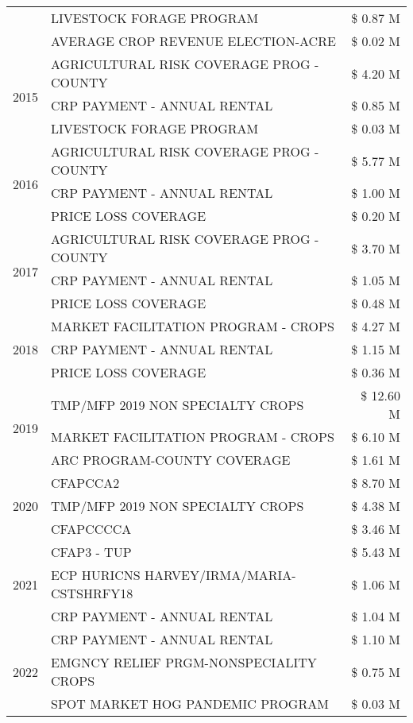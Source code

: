 \begin{tabular}{llr}
 & LIVESTOCK FORAGE PROGRAM & \$ 0.87 M \\
 & AVERAGE CROP REVENUE ELECTION-ACRE & \$ 0.02 M \\
\cline{1-3}
\multirow[t]{3}{*}{2015} & AGRICULTURAL RISK COVERAGE PROG - COUNTY & \$ 4.20 M \\
 & CRP PAYMENT - ANNUAL RENTAL & \$ 0.85 M \\
 & LIVESTOCK FORAGE PROGRAM & \$ 0.03 M \\
\cline{1-3}
\multirow[t]{3}{*}{2016} & AGRICULTURAL RISK COVERAGE PROG - COUNTY & \$ 5.77 M \\
 & CRP PAYMENT - ANNUAL RENTAL & \$ 1.00 M \\
 & PRICE LOSS COVERAGE & \$ 0.20 M \\
\cline{1-3}
\multirow[t]{3}{*}{2017} & AGRICULTURAL RISK COVERAGE PROG - COUNTY & \$ 3.70 M \\
 & CRP PAYMENT - ANNUAL RENTAL & \$ 1.05 M \\
 & PRICE LOSS COVERAGE & \$ 0.48 M \\
\cline{1-3}
\multirow[t]{3}{*}{2018} & MARKET FACILITATION PROGRAM - CROPS & \$ 4.27 M \\
 & CRP PAYMENT - ANNUAL RENTAL & \$ 1.15 M \\
 & PRICE LOSS COVERAGE & \$ 0.36 M \\
\cline{1-3}
\multirow[t]{3}{*}{2019} & TMP/MFP 2019 NON SPECIALTY CROPS & \$ 12.60 M \\
 & MARKET FACILITATION PROGRAM - CROPS & \$ 6.10 M \\
 & ARC PROGRAM-COUNTY COVERAGE & \$ 1.61 M \\
\cline{1-3}
\multirow[t]{3}{*}{2020} & CFAPCCA2 & \$ 8.70 M \\
 & TMP/MFP 2019 NON SPECIALTY CROPS & \$ 4.38 M \\
 & CFAPCCCCA & \$ 3.46 M \\
\cline{1-3}
\multirow[t]{3}{*}{2021} & CFAP3 - TUP & \$ 5.43 M \\
 & ECP HURICNS HARVEY/IRMA/MARIA-CSTSHRFY18 & \$ 1.06 M \\
 & CRP PAYMENT - ANNUAL RENTAL & \$ 1.04 M \\
\cline{1-3}
\multirow[t]{3}{*}{2022} & CRP PAYMENT - ANNUAL RENTAL & \$ 1.10 M \\
 & EMGNCY RELIEF PRGM-NONSPECIALITY CROPS & \$ 0.75 M \\
 & SPOT MARKET HOG PANDEMIC PROGRAM & \$ 0.03 M \\
\cline{1-3}
\bottomrule
\end{tabular}
